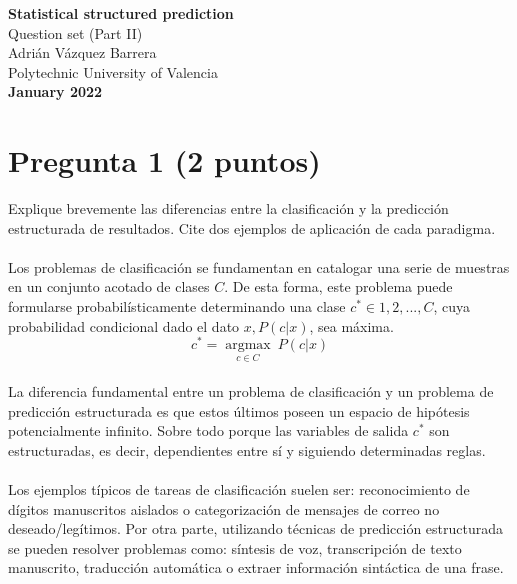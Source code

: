 \documentclass[12pt]{article}
\begin{document}
\begin{titlepage}
    \begin{center}
        \vspace*{1cm}
         \textbf{\huge Statistical structured prediction} \\        
        \vspace{0.25cm}
         {\LARGE Question set (Part II)}\\
        \vfill
        Adrián Vázquez Barrera \\
        \vspace{0.25cm}
        Polytechnic University of Valencia\\
        \vspace{0.25cm}
        \textbf{January 2022}
             
    \end{center}
 \end{titlepage}

\newpage

\section*{Pregunta 1 (2 puntos)}
Explique brevemente las diferencias entre la clasificación y la predicción estructurada de resultados. Cite dos ejemplos de aplicación de cada paradigma.
\\\\
Los problemas de clasificación se fundamentan en catalogar una serie de muestras en un conjunto acotado de clases $C$. 
De esta forma, este problema puede formularse probabilísticamente determinando
una clase $c^* \in {1,2,...,C}$, cuya probabilidad
condicional dado el dato $x, P(c|x)$, sea máxima.
\\
\begin{equation*}
    c^* = \underset{c \in C}{\operatorname{argmax}} ~ P(c|x)
\end{equation*}
\\
La diferencia fundamental entre un problema de clasificación y un problema de predicción estructurada es que estos últimos poseen un espacio de hipótesis potencialmente infinito. Sobre todo porque las variables de salida $c^*$ son estructuradas, es decir, dependientes entre sí y siguiendo determinadas reglas.
\\\\
Los ejemplos típicos de tareas de clasificación suelen ser: reconocimiento de dígitos manuscritos aislados o categorización de mensajes de correo no deseado/legítimos. Por otra parte, utilizando técnicas de predicción estructurada se pueden resolver problemas como: síntesis de voz, transcripción de texto manuscrito, traducción automática o extraer información sintáctica de una frase.
\newpage
\end{document}
